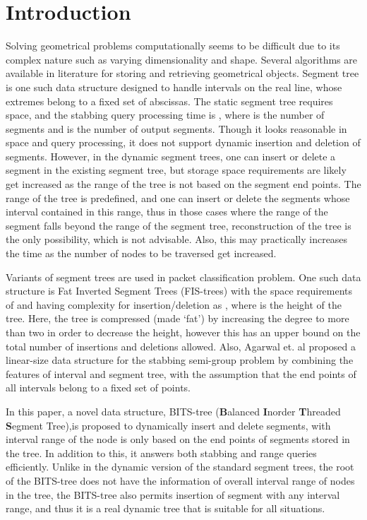 \documentclass{article}
\begin{document}
\section{Introduction}
Solving geometrical problems computationally seems to be difficult due to its complex nature such as varying dimensionality and shape. Several algorithms are available in literature\cite{bcko,ps} for storing and retrieving geometrical objects. Segment tree \cite{b1} is one such data structure designed to handle intervals on the real line, whose extremes belong to a fixed set of abscissas. The static segment tree requires  space, and the stabbing query processing time is , where  is the number of segments and  is the number of output segments. Though it looks reasonable in space and query processing, it does not support dynamic insertion and deletion of segments. However, in the dynamic segment trees, one can insert or delete a segment in the existing segment tree, but storage space requirements are likely get increased as the range of the tree is not based on the segment end points. The range of the tree is predefined, and one can insert or delete the segments whose interval contained in this range, thus in those cases where the range of the segment falls beyond the range of the segment tree, reconstruction of the tree is the only possibility, which is not advisable. Also, this may practically increases the time as the number of nodes to be traversed get increased.  
\par
Variants of segment trees are used in packet classification problem. One such data structure is Fat Inverted Segment Trees (FIS-trees) \cite{fm,t} with the space requirements of  and having complexity for insertion/deletion as , where  is the height of the tree. Here, the tree is compressed  (made `fat') by increasing the degree to more than two in order to decrease the height, however this has an upper bound on the total number of insertions and deletions allowed. Also, Agarwal et. al \cite{aa} proposed a linear-size data structure for the stabbing semi-group problem by combining the features of interval and segment tree, with the assumption that the end points of all intervals belong to a fixed set of points. 
\par
In this paper, a novel data structure, BITS-tree (\textbf{B}alanced \textbf{I}norder \textbf{T}hreaded \textbf{S}egment Tree),is proposed to dynamically insert and delete segments, with interval range of the node is only based on the end points of segments stored in the tree. In addition to this, it answers both stabbing and range queries efficiently. Unlike in the dynamic version of the standard segment trees, the root of the BITS-tree does not have the information of overall interval range of nodes in the tree, the BITS-tree also permits insertion of segment with any interval range, and thus it is a real dynamic tree that is suitable for all situations. 
\end{document}
